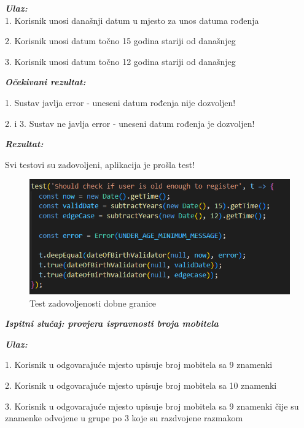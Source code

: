             \textbf{\textit{Ulaz:}}\\
            
             1. Korisnik unosi današnji datum u mjesto za unos datuma rođenja

             2. Korisnik unosi datum točno 15 godina stariji od današnjeg

             3. Korisnik unosi datum točno 12 godina stariji od današnjeg

             \textbf{\textit{Očekivani rezultat:}}

             1. Sustav javlja error - uneseni datum rođenja nije dozvoljen!

             2. i 3. Sustav ne javlja error - uneseni datum rođenja je dozvoljen!

             \textbf{\textit{Rezultat:}}

             Svi testovi su zadovoljeni, aplikacija je prošla test!

\begin{figure}[H]
			\includegraphics[scale=0.5]{slike/ageTest.PNG} %
			\centering
			\caption{Test zadovoljenosti dobne granice}
			\label{fig:aaa}
			
		\end{figure}
	
	 \textbf{\textit{Ispitni slučaj: provjera ispravnosti broja mobitela}}

            \textbf{\textit{Ulaz:}}

             1. Korisnik u odgovarajuće mjesto upisuje broj mobitela sa 9 znamenki

             2. Korisnik u odgovarajuće mjesto upisuje broj mobitela sa 10 znamenki

             3. Korisnik u odgovarajuće mjesto upisuje broj mobitela sa 9 znamenki čije su znamenke odvojene u grupe po 3 koje su razdvojene razmakom

